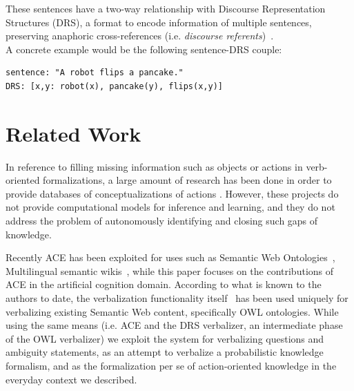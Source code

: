 \documentclass[oribibl]{llncs}
\begin{document}
These sentences have a two-way relationship with Discourse Representation 
Structures (DRS), a format to encode information of multiple sentences, 
preserving anaphoric cross-references (i.e. \textit{discourse referents})~\cite{kamp1993discourse}.\\
A concrete example would be the following sentence-DRS couple: 
{\small \begin{verbatim}
sentence: "A robot flips a pancake." 
DRS: [x,y: robot(x), pancake(y), flips(x,y)]
\end{verbatim}
}

\section{Related Work} 

In reference to filling missing information such as objects or
 actions in verb-oriented formalizations, a large amount of 
 research has been done in order to provide databases of conceptualizations of actions \cite
{baker1998berkeley, schuler2005verbnet, kingsbury2002treebank}.
However, these projects do not provide computational models for 
inference and learning, and they do not address the problem of
 autonomously identifying and closing such
gaps of knowledge.

Recently ACE has been exploited for uses such 
as Semantic Web Ontologies~\cite{kaljurand:phd}, Multilingual 
semantic wikis~\cite{kuhnkaljurandsemantic}, while this paper 
focuses on the contributions of ACE in the artificial cognition 
domain. According to what is known to the authors to date, the 
verbalization functionality itself~\cite{kaljurand:phd} has been 
used uniquely for verbalizing existing Semantic Web content, 
specifically OWL ontologies. While using the same means (i.e. ACE and the 
DRS verbalizer, an intermediate phase of the OWL verbalizer) we 
exploit the system for verbalizing questions and ambiguity statements, 
as an attempt to verbalize a probabilistic knowledge formalism, and 
as the formalization per se of action-oriented knowledge in the 
everyday context we described.

\end{document}
